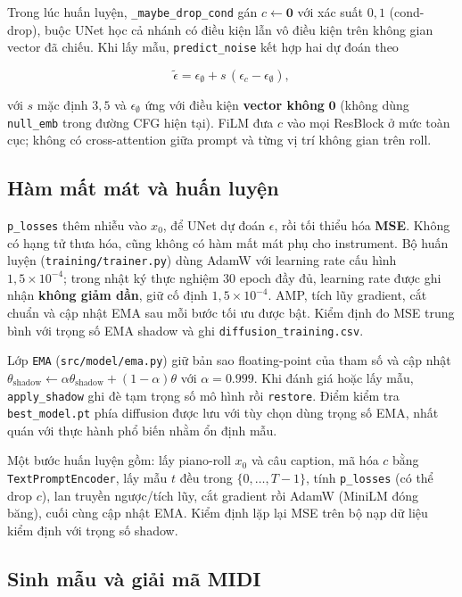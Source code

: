 Trong lúc huấn luyện, \texttt{\_maybe\_drop\_cond} gán $c\leftarrow\mathbf{0}$ với xác suất $0{,}1$ (cond-drop), buộc UNet học cả nhánh có điều kiện lẫn vô điều kiện trên không gian vector đã chiếu. Khi lấy mẫu, \texttt{predict\_noise} kết hợp hai dự đoán theo

\[
\tilde\epsilon
=
\epsilon_{\emptyset}
+
s\,(\epsilon_{c}-\epsilon_{\emptyset}),
\]

với $s$ mặc định $3{,}5$ và $\epsilon_{\emptyset}$ ứng với điều kiện \textbf{vector không} $\mathbf{0}$ (không dùng \texttt{null\_emb} trong đường CFG hiện tại). FiLM đưa $c$ vào mọi ResBlock ở mức toàn cục; không có cross-attention giữa prompt và từng vị trí không gian trên roll.

\subsection{Hàm mất mát và huấn luyện}

\texttt{p\_losses} thêm nhiễu vào $x_0$, để UNet dự đoán $\epsilon$, rồi tối thiểu hóa \textbf{MSE}. Không có hạng tử thưa hóa, cũng không có hàm mất mát phụ cho instrument. Bộ huấn luyện (\texttt{training/trainer.py}) dùng AdamW với learning rate cấu hình $1{,}5\times 10^{-4}$; trong nhật ký thực nghiệm 30 epoch đầy đủ, learning rate được ghi nhận \textbf{không giảm dần}, giữ cố định $1{,}5\times 10^{-4}$. AMP, tích lũy gradient, cắt chuẩn và cập nhật EMA sau mỗi bước tối ưu được bật. Kiểm định đo MSE trung bình với trọng số EMA shadow và ghi \texttt{diffusion\_training.csv}.

Lớp \texttt{EMA} (\texttt{src/model/ema.py}) giữ bản sao floating-point của tham số và cập nhật
$\theta_{\mathrm{shadow}} \leftarrow \alpha\theta_{\mathrm{shadow}} + (1-\alpha)\theta$
với $\alpha=0.999$. Khi đánh giá hoặc lấy mẫu, \texttt{apply\_shadow} ghi đè tạm trọng số mô hình rồi \texttt{restore}. Điểm kiểm tra \texttt{best\_model.pt} phía diffusion được lưu với tùy chọn dùng trọng số EMA, nhất quán với thực hành phổ biến nhằm ổn định mẫu.

Một bước huấn luyện gồm: lấy piano-roll $x_0$ và câu caption, mã hóa $c$ bằng \texttt{TextPromptEncoder}, lấy mẫu $t$ đều trong $\{0,\ldots,T-1\}$, tính \texttt{p\_losses} (có thể drop $c$), lan truyền ngược/tích lũy, cắt gradient rồi AdamW (MiniLM đóng băng), cuối cùng cập nhật EMA. Kiểm định lặp lại MSE trên bộ nạp dữ liệu kiểm định với trọng số shadow.

\subsection{Sinh mẫu và giải mã MIDI}
\label{sec:ch3-diff-decode}

